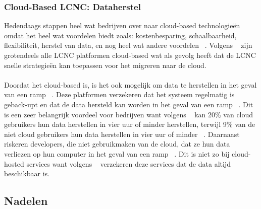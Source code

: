 \subsubsection{Cloud-Based LCNC: Dataherstel}
\label{subsec:cloud-based-lcnc}
Hedendaags stappen heel wat bedrijven over naar cloud-based technologieën omdat het heel 
wat voordelen biedt zoals: kostenbesparing, schaalbaarheid, flexibiliteit, herstel van data, en nog heel wat andere voordelen ~\autocite{Sufi_2023}.
Volgens ~\textcites{Sufi_2023} zijn grotendeels alle LCNC platformen cloud-based wat als gevolg heeft dat
de LCNC snelle strategieën kan toepassen voor het migreren naar de cloud.
\\
\\
Doordat het cloud-based is, is het ook mogelijk om data te herstellen in het geval van een ramp ~\autocite{Sufi_2023}.
Deze platformen verzekeren dat het systeem regelmatig is geback-upt en dat de data hersteld kan worden in het geval van een ramp ~\autocite{Sufi_2023}.
Dit is een zeer belangrijk voordeel voor bedrijven want volgens ~\textcite{Sufi_2023} 
kan 20\% van cloud gebruikers hun data herstellen in vier uur of minder herstellen, terwijl 9\%
van de niet cloud gebruikers hun data herstellen in vier uur of minder ~\autocite{Sufi_2023}. Daarnaast riskeren developers, die niet gebruikmaken van de cloud,
dat ze hun data verliezen op hun computer in het geval van een ramp ~\autocite{Sufi_2023}. Dit is niet zo bij cloud-hosted services want volgens ~\textcite{Sufi_2023}
verzekeren deze services dat de data altijd beschikbaar is.

\subsection{Nadelen}%
\label{subsec:nadelen}
